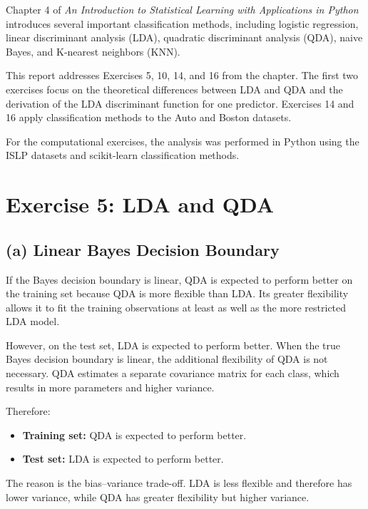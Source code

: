 \documentclass[12pt,a4paper]{article}
\begin{document}
Chapter 4 of \textit{An Introduction to Statistical Learning with Applications
in Python} introduces several important classification methods, including
logistic regression, linear discriminant analysis (LDA), quadratic
discriminant analysis (QDA), naive Bayes, and K-nearest neighbors (KNN).

This report addresses Exercises 5, 10, 14, and 16 from the chapter. The
first two exercises focus on the theoretical differences between LDA and
QDA and the derivation of the LDA discriminant function for one predictor.
Exercises 14 and 16 apply classification methods to the Auto and Boston
datasets.

For the computational exercises, the analysis was performed in Python using
the ISLP datasets and scikit-learn classification methods.


\section{Exercise 5: LDA and QDA}

\subsection{(a) Linear Bayes Decision Boundary}

If the Bayes decision boundary is linear, QDA is expected to perform better
on the training set because QDA is more flexible than LDA. Its greater
flexibility allows it to fit the training observations at least as well as
the more restricted LDA model.

However, on the test set, LDA is expected to perform better. When the true
Bayes decision boundary is linear, the additional flexibility of QDA is not
necessary. QDA estimates a separate covariance matrix for each class, which
results in more parameters and higher variance.

Therefore:

\begin{itemize}
    \item \textbf{Training set:} QDA is expected to perform better.
    \item \textbf{Test set:} LDA is expected to perform better.
\end{itemize}

The reason is the bias--variance trade-off. LDA is less flexible and
therefore has lower variance, while QDA has greater flexibility but higher
variance.
\end{document}
